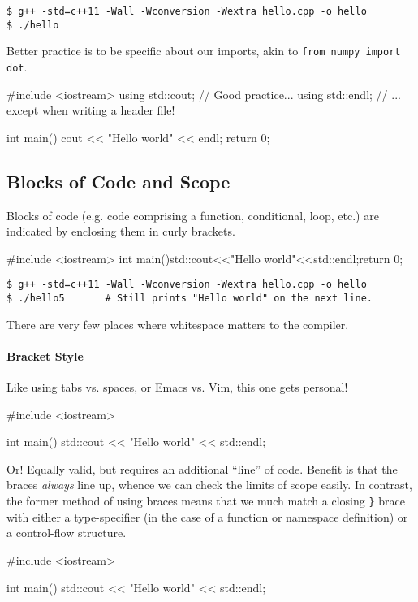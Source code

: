 \documentclass[12pt,letterpaper,twoside]{article}
\begin{document}
{\footnotesize
\begin{verbatim}
$ g++ -std=c++11 -Wall -Wconversion -Wextra hello.cpp -o hello
$ ./hello
\end{verbatim}
}

Better practice is to be specific about our imports, akin to
\texttt{from numpy import dot}.
\begin{cpp}
#include <iostream>
using std::cout;    // Good practice...
using std::endl;    // ... except when writing a header file!

int main() {
  cout << "Hello world" << endl;
  return 0;
}
\end{cpp}

\subsection{Blocks of Code and Scope}
Blocks of code (e.g. code comprising a function, conditional,
loop, etc.) are indicated by enclosing them in curly brackets.

\begin{cpp}
#include <iostream>
int main(){std::cout<<"Hello world"<<std::endl;return 0;}
\end{cpp}

\begin{verbatim}
$ g++ -std=c++11 -Wall -Wconversion -Wextra hello.cpp -o hello
$ ./hello5       # Still prints "Hello world" on the next line.
\end{verbatim}

There are very few places where whitespace matters to the compiler.

\paragraph{Bracket Style} Like using tabs vs. spaces, or Emacs
vs. Vim, this one gets personal!

\begin{cpp}
#include <iostream>

int main() {
  std::cout << "Hello world" << std::endl;
}
\end{cpp}

Or! Equally valid, but requires an additional ``line'' of
code. Benefit is that the braces \emph{always} line up, whence we can
check the limits of scope easily. In contrast, the former method of
using braces means that we much match a closing \texttt{\}} brace with
either a type-specifier (in the case of a function or namespace
definition) or a control-flow structure.
\begin{cpp}
#include <iostream>

int main()
{
  std::cout << "Hello world" << std::endl;
}
\end{cpp}
\end{document}
